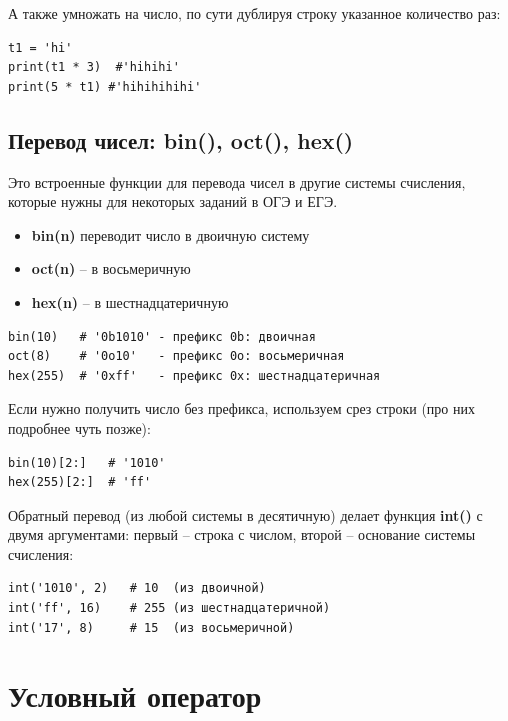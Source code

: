 \documentclass[12pt,a4paper]{article}
\begin{document}
А также умножать на число, по сути дублируя строку указанное количество раз:
\begin{verbatim}
t1 = 'hi'
print(t1 * 3)  #'hihihi'
print(5 * t1) #'hihihihihi'
\end{verbatim}

\subsection*{Перевод чисел: bin(), oct(), hex()}

Это встроенные функции для перевода чисел в другие системы счисления, которые нужны для некоторых заданий в ОГЭ и ЕГЭ.
\medskip

\begin{itemize}
    \item \textbf{bin(n)} переводит число в двоичную систему
    \item \textbf{oct(n)} -- в восьмеричную
    \item \textbf{hex(n)} -- в шестнадцатеричную
\end{itemize}

\begin{verbatim}
bin(10)   # '0b1010' - префикс 0b: двоичная
oct(8)    # '0o10'   - префикс 0o: восьмеричная
hex(255)  # '0xff'   - префикс 0x: шестнадцатеричная
\end{verbatim}
\medskip

Если нужно получить число без префикса, используем срез строки (про них подробнее чуть позже):

\begin{verbatim}
bin(10)[2:]   # '1010'
hex(255)[2:]  # 'ff'
\end{verbatim}
\medskip

Обратный перевод (из любой системы в десятичную) делает функция \textbf{int()} с двумя аргументами: первый -- строка с числом, второй -- основание системы счисления:

\begin{verbatim}
int('1010', 2)   # 10  (из двоичной)
int('ff', 16)    # 255 (из шестнадцатеричной)
int('17', 8)     # 15  (из восьмеричной)
\end{verbatim}

\section*{Условный оператор}
\end{document}
